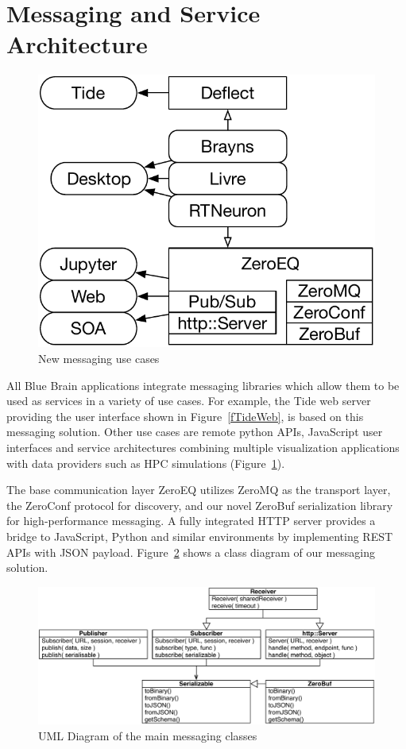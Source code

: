 \documentclass[10pt]{llncs}
\newcommand{\fig}[1]{Figure~\ref{#1}}
\begin{document}
\section{Messaging and Service Architecture}

\begin{figure}\center\vspace{-6ex}
  \includegraphics[width=.382\textwidth]{images/ZeroMS}
  {\caption{\label{fZero}New messaging use cases}}\vspace{-2ex}
\end{figure}

All Blue Brain applications integrate messaging libraries which allow them to be
used as services in a variety of use cases. For example, the Tide web server
providing the user interface shown in \fig{fTideWeb}, is based on this messaging
solution. Other use cases are remote python APIs, JavaScript user interfaces and
service architectures combining multiple visualization applications with data
providers such as HPC simulations (\fig{fZero}).

The base communication layer ZeroEQ utilizes ZeroMQ as the transport layer, the
ZeroConf protocol for discovery, and our novel ZeroBuf serialization library for
high-performance messaging. A fully integrated HTTP server provides a bridge to
JavaScript, Python and similar environments by implementing REST APIs with JSON
payload. \fig{fUML} shows a class diagram of our messaging solution.

\begin{figure}[ht]\center
  \includegraphics[width=\columnwidth]{images/ZeroMSUML}
  \caption{\label{fUML}UML Diagram of the main messaging classes}
\end{figure}
\end{document}
